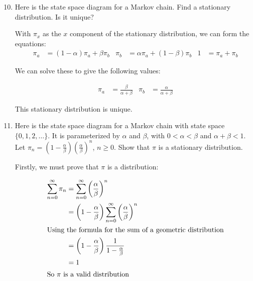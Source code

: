 \documentclass[10pt,\jkfside,a4paper]{article}
\begin{document}
\begin{enumerate}

\setcounter{enumi}{9}

\item Here is the state space diagram for a Markov chain. Find a stationary
distribution. Is it unique?

\begin{center}
\end{center}

With $\pi_x$ as the $x$ component of the stationary distribution, we can
form the equations:
\begin{align*}
\pi_a &= (1 - \alpha)\pi_a + \beta\pi_b
&
\pi_b &= \alpha \pi_a + (1 - \beta) \pi_b
&
1 &= \pi_a + \pi_b
\end{align*}

We can solve these to give the following values:

\begin{align*}
\pi_a &= \frac{\beta}{\alpha + \beta}
&
\pi_b &= \frac{\alpha}{\alpha + \beta}
\end{align*}

This stationary distribution is unique.

\item Here is the state space diagram for a Markov chain with state space
$\{0, 1, 2, \dots\}$. It is parameterized by $\alpha$ and $\beta$, with
$0 < \alpha < \beta$ and $\alpha + \beta < 1$. Let $\pi_n = \left( 1 -
\frac{\alpha}{\beta} \right)\left( \frac{\alpha}{\beta} \right)^n $, $n \geq
0$. Show that $\pi$ is a stationary distribution.

Firstly, we must prove that $\pi$ is a distribution:

\begin{align*}
\sum^{\infty}_{n=0} \pi_n
&= \sum^{\infty}_{n=0} \left(
\frac{\alpha}{\beta} \right)^n \\
&= \left( 1 - \frac{\alpha}{\beta} \right) \sum^{\infty}_{n=0} \left(
\frac{\alpha}{\beta} \right)^n \\
\intertext{Using the formula for the sum of a geometric distribution}
&= \left( 1 - \frac{\alpha}{\beta} \right) \frac{1}{1 -
\frac{\alpha}{\beta}} \\
&= 1 \\
\intertext{So $\pi$ is a valid distribution}
\end{align*}


\end{enumerate}
\end{document}
